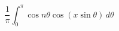 \documentclass{article}
\begin{document}
    \[
    \frac{1}{\pi} \int_{0}^{\pi} \cos n\theta \cos(x \sin \theta) \, d\theta
    \]
    
\end{document}
